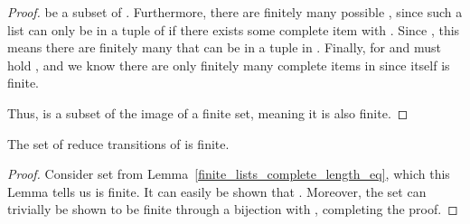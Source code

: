 \begin{isabellebody}
\begin{isamarkuptext}
\begin{lemma}
\begin{proof}
be a subset of . Furthermore, there are finitely many possible , since such a list can
only be in a tuple of  if there exists some complete item  with
. Since , this means there are finitely many
 that can be in a tuple in . Finally, for  and \isa{{\isasymalpha}} must hold ,
and we know there are only finitely many complete items in  since 
itself is finite.

Thus,  is a subset of the image of a finite set, meaning it is also finite.
\end{proof}
\end{lemma}

\begin{lemma}\label{finite_eps_P0_reduce}
The set of reduce transitions  of  is finite.
\begin{proof}
Consider set  from Lemma~\ref{finite_lists_complete_length_eq}, which this Lemma tells us is finite.
It can easily be shown that .
Moreover, the set  can trivially be
shown to be finite through a bijection with ,
completing the proof.
\end{proof}
\end{lemma}


\end{isamarkuptext}
\end{isabellebody}
